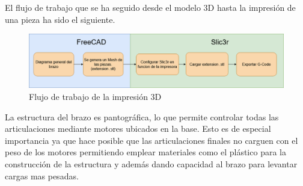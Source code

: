 El flujo de trabajo que se ha seguido desde el modelo 3D hasta la impresión de una pieza ha sido el siguiente.

\begin{figure}[H]
    \centering
    \includegraphics[width=.9\linewidth]{pictures/flujo_trabajo_impresion.png}
    \caption{Flujo de trabajo de la impresión 3D}
    \label{fig:flujo_3d}
\end{figure}

La estructura del brazo es pantográfica, lo que permite controlar todas las articulaciones mediante motores ubicados en la base. Esto es de especial importancia ya que hace posible que las articulaciones finales no carguen con el peso de los motores permitiendo emplear materiales como el plástico para la construcción de la estructura y además dando capacidad al brazo para levantar cargas mas pesadas.



